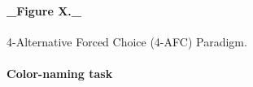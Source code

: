 \paragraph{_Figure X._} 4-Alternative Forced Choice (4-AFC) Paradigm. 

\paragraph{Color-naming task} 



